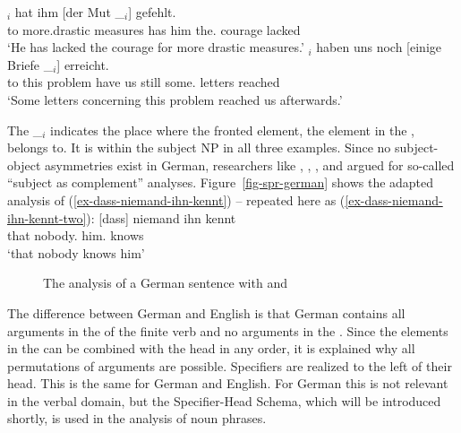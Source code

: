 \ex 
{}$_i$ hat ihm [der Mut \_$_i$] gefehlt.\\
     \spacebr{}to more.drastic measures has him \spacebr{}the.\NOM{} courage {} lacked\\
\glt `He has lacked the courage for more drastic measures.'
\ex 
{}$_i$ haben uns noch [einige Briefe \_$_i$] erreicht.\footnotemark\\
     \spacebr{}to this problem have us still \spacebr{}some.\NOM{} letters {} reached\\
\glt `Some letters concerning this problem reached us afterwards.'
\zl

\noindent
The \_$_i$ indicates the place where the fronted element, the element in the \vf, belongs to. It is
within the subject NP in all three examples. Since no subject-object asymmetries exist in German,
researchers like \citet[]{Pollard90a}, \citet[Section~6.3.2]{Haider93a}, \citet[]{Eisenberg94b}, and \citet[, 78]{Kiss95a} argued for so-called ``subject as complement'' analyses. 
Figure~\vref{fig-spr-german} shows the adapted analysis of
(\ref{ex-dass-niemand-ihn-kennt}) -- repeated here as
(\ref{ex-dass-niemand-ihn-kennt-two}):
\ea
\label{ex-dass-niemand-ihn-kennt-two}
\gll  {}[dass] niemand ihn kennt\\
      \spacebr{}that nobody.\NOM{} him.\ACC{} knows\\ 
\glt `that nobody knows him'
\z
\begin{figure}
\caption{\label{fig-spr-german}The analysis of a German sentence with \spr and \compsl}
\end{figure}
The difference between German and English is that German contains all arguments in the \compsl of
the finite verb and no arguments in the \sprl. Since the elements in the \compsl can be combined
with the head in any order, it is explained why all permutations of arguments are
possible. Specifiers are realized to the left of their head. This is the same for German and
English. For German this is not relevant in the verbal domain, but the Specifier-Head Schema, which
will be introduced shortly, is used in the analysis of noun phrases.

